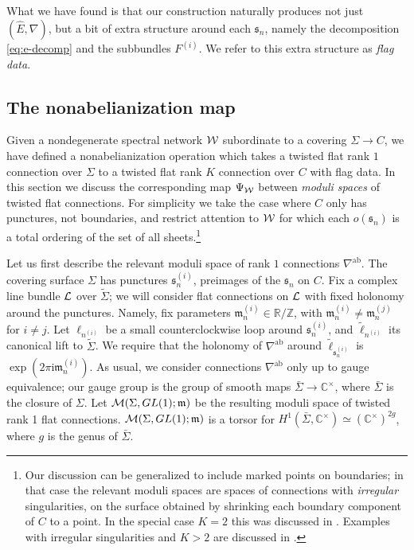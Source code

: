 \documentclass[11pt,a4paper]{article}
\def\IC{\mathbb{C}}
\def\R{{\mathbb{R}}}
\def\Z{{\mathbb{Z}}}
\def\CM {{\cal M}}
\def\CL {{\cal L}}
\def\wnet {{\cal W}}
\def\ab{{\mathrm{ab}}}
\newcommand{\ti}[1]{\textit{#1}}
\def\fm{\mathfrak{m}}
\def\fs{\mathfrak{s}}
\def\IC{\mathbb{C}}
\def\CM {{\cal M}}
\def\CL {{\cal L}}
\def\wnet {{\cal W}}
\newcommand\I{{\mathrm i}}
\begin{document}
What we have found is that our construction naturally produces not just $({\hat E}, \nabla)$, but a bit of extra structure around each $\fs_n$, namely the decomposition \eqref{eq:e-decomp} and
the subbundles $F^{(i)}$.  We refer to this extra structure as \ti{flag data}.



\subsection{The nonabelianization map}

Given a nondegenerate spectral network $\wnet$ subordinate to a covering
$\Sigma \to C$, we have defined a nonabelianization operation which takes
a twisted flat rank $1$ connection over $\Sigma$ to a twisted flat rank $K$
connection over $C$ with flag data.  In this section we discuss the corresponding
map $\Psi_{\wnet}$ between \ti{moduli spaces} of twisted flat connections.
For simplicity we take the case where $C$ only has punctures, not boundaries,
and restrict attention to $\wnet$ for which each $o(\fs_n)$ is a total ordering
of the set of all sheets.\footnote{Our discussion can be generalized
to include marked points on boundaries; in that case the relevant moduli spaces
are spaces of connections with \ti{irregular} singularities, on the surface obtained
by shrinking each boundary component of $C$ to a point.
In the special case $K=2$ this was discussed in \cite{Gaiotto:2009hg}.
Examples with irregular singularities and $K>2$ are discussed in
\cite{gmn6-to-appear}.}

Let us first describe the relevant moduli space of rank $1$ connections $\nabla^\ab$.
The covering surface
$\Sigma$ has punctures $\mathfrak{s}_n^{(i)}$, preimages of the $\fs_n$ on $C$.
Fix a complex line bundle $\CL$ over $\tilde{\Sigma}$;
we will consider flat connections
on $\CL$ with fixed holonomy around the punctures.
Namely, fix parameters $\fm^{(i)}_n \in \R / \Z$, with $\fm^{(i)}_n \neq \fm^{(j)}_n$
for $i \neq j$.
Let $\ell_{n^{(i)}}$ be a small counterclockwise
loop around $\fs_n^{(i)}$, and $\tilde \ell_{n^{(i)}}$ its canonical
lift to $\tilde \Sigma$.  We require that the holonomy of $\nabla^\ab$ around
$\tilde \ell_{\fs_n^{(i)}}$ is $\exp (2 \pi \I \mathfrak{m}_n^{(i)})$.
As usual, we consider connections $\nabla^\ab$
only up to gauge equivalence;
our gauge group is the group of smooth
maps $\bar \Sigma \to \IC^\times$,
where $\bar \Sigma$ is the closure
of $\Sigma$.  Let $\CM(\Sigma, GL(1); \mathfrak{m})$ be the resulting
moduli space of twisted rank 1 flat connections.
$\CM(\Sigma, GL(1); \mathfrak{m})$ is a torsor for
$H^1(\bar \Sigma, \IC^\times) \simeq (\IC^\times)^{2g}$, where $g$
is the genus of $\bar\Sigma$.
\end{document}
